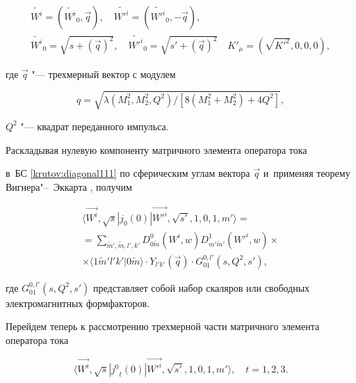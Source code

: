 \begin{gather}

\tilde{W^{i}}=(\tilde{W^{i}}_{0},\vec{q}), \quad \tilde{W'^{i}}=(\tilde{W'^{i}}_{0},-\vec{q}),

\\

\tilde{W^{i}}_{0}=\sqrt{s+(\vec{q})^{2}}, \quad \tilde{W'^{i}}_{0}=\sqrt{s'+(\vec{q})^{2}} \quad

K'_{\mu}=(\sqrt{K'^{2}}, 0, 0, 0),

\label{krutov:breit}

\end{gather}

где $\vec{q}$ "--- трехмерный вектор с модулем

$$q=\sqrt{\lambda(M^2_{1},M^2_{2},Q^2)/[8(M_{1}^{2}+M_{2}^{2})+4Q^2]},$$

 $Q^2$ "--- квадрат переданного импульса.



Раскладывая нулевую компоненту матричного элемента оператора тока

в~БС \eqref{krutov:diagonal111} по сферическим углам вектора $\vec{q}$ и~применяя теорему Вигнера"--~Эккарта \cite{Zar93}, получим

\begin{multline}\label{krutov:A11}

\langle\vec{W^{i}},\sqrt{s}|{j_0}(0)|\vec{W'^{i}},\sqrt{s'}, 1, 0, 1, m'\rangle=

\\

=

\sum_{ \tilde{m}', \tilde{m}, l', k'}D^{0}_{0

\tilde{m}}(W^{i},w) D^{1}_{m'\tilde{m}'}(W'^{i},w)

\times 

\\

\times

\langle 1 \tilde{m}' l'k' |0 \tilde{m}\rangle \cdot Y_{l' k'}(\vec{q})\cdot G^{0, l'}_{01}(s,Q^2,s'),

\end{multline}

где $G^{0, l'}_{01}(s,Q^2,s')$ представляет собой набор скаляров или свободных электромагнитных формфакторов.



Перейдем теперь к рассмотрению трехмерной части матричного элемента оператора тока

\begin{equation}\label{krutov:breit1}

\langle\vec{{W^{i}}},\sqrt{s}|{{j^0}}_{t}(0)|\vec{{W'^{i}}},\sqrt{s'}, 1, 0, 1, {m}'\rangle,

\quad t = 1, 2, 3.

\end{equation}

